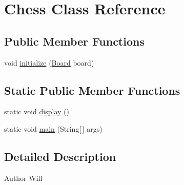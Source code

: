 \hypertarget{class_chess}{\section{Chess Class Reference}
\label{class_chess}
}
\subsection*{Public Member Functions}
\begin{DoxyCompactItemize}
\item 
void \hyperlink{class_chess_a8068164c49375f3d06ede999f893d9a8}{initialize} (\hyperlink{class_board}{Board} board)
\end{DoxyCompactItemize}
\subsection*{Static Public Member Functions}
\begin{DoxyCompactItemize}
\item 
static void \hyperlink{class_chess_ae7b3c183e827ec0fd391009b2c488e3f}{display} ()
\item 
static void \hyperlink{class_chess_a0e09337516b7b3c6a0fb8d422c348f6c}{main} (String\mbox{[}$\,$\mbox{]} args)
\end{DoxyCompactItemize}


\subsection{Detailed Description}
\begin{DoxyAuthor}{Author}
Will 
\end{DoxyAuthor}


